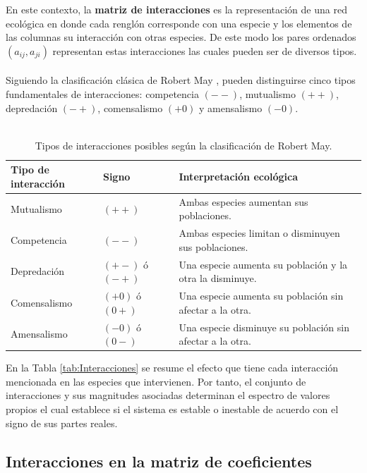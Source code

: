 En este contexto, la \textbf{matriz de interacciones} es la representación de una red ecológica en donde cada renglón corresponde con una especie y los elementos de las columnas su interacción con otras especies. De este modo los pares ordenados $(a_{ij},a_{ji})$ representan estas interacciones las cuales pueden ser de diversos tipos. \\
\\
Siguiendo la clasificación clásica de Robert May \cite{may2019stability}, pueden distinguirse cinco tipos fundamentales de interacciones: competencia $(--)$, mutualismo $(++)$, depredación $(-+)$, comensalismo $(+0)$ y amensalismo $(-0)$.
\\
\\
\begin{table}[h!]
	\centering
	\begin{tabular}{lll}
		\toprule
		\rowcolor{gray!15}
		Tipo de interacción & Signo & Interpretación ecológica \\
		\midrule
		Mutualismo        & $(++)$ & Ambas especies aumentan sus poblaciones.\\
		Competencia        & $(--)$ & Ambas especies limitan o disminuyen sus poblaciones.\\
		Depredación  & $(+-)$ ó $(-+)$ & Una especie aumenta su población y la otra la disminuye.\\
		Comensalismo       & $(+0)$ ó $(0+)$& Una especie aumenta su población sin afectar a la otra. \\
		Amensalismo        & $(-0)$ ó $(0-)$ & Una especie disminuye su población sin afectar a la otra. \\
		\bottomrule
	\end{tabular}
	\caption{Tipos de interacciones posibles según la clasificación de Robert May.}
	\label{tab:Interacciones}
\end{table}

En la Tabla \eqref{tab:Interacciones} se resume el efecto que tiene cada interacción mencionada en las especies que intervienen. Por tanto, el conjunto de interacciones y sus magnitudes asociadas determinan el espectro de valores propios el cual establece si el sistema es estable o inestable de acuerdo con el signo de sus partes reales. 

\subsection{Interacciones en la matriz de coeficientes}

